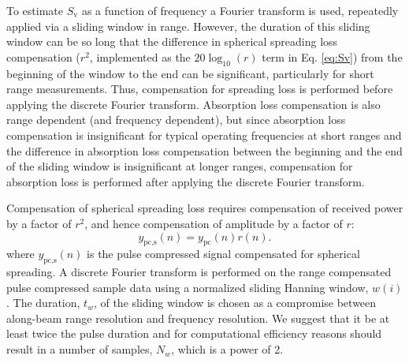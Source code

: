 \documentclass[preprint,12pt,TurnOnLineNumbers]{JASAnew}
\newcommand{\samplesymt}{n}
\newcommand{\genidxsym}{i}
\newcommand{\ypc}{y_{\textrm{pc}}}
\newcommand{\ypcspread}{y_{\textrm{pc,s}}}
\newcommand{\hannw}{w}
\newcommand{\nw}{N_{\hannw}}
\newcommand{\tslide}{t_w}
\newcommand{\sv}{S_{\textrm{v}}}
\newcommand{\range}{r}
\begin{document}
To estimate $\sv$ as a function of frequency a Fourier transform is used, repeatedly applied via a sliding window in range. However, the duration of this sliding window can be so long that the difference in spherical spreading loss compensation ($r^2$, implemented as the $20\log_{10}(\range)$ term in Eq. \ref{eq:Sv}) from the beginning of the window to the end can be significant, particularly for short range measurements. Thus, compensation for spreading loss is performed before applying the discrete Fourier transform. Absorption loss compensation is also range dependent (and frequency dependent), but since absorption loss compensation is insignificant for typical operating frequencies at short ranges and the difference in absorption loss compensation between the beginning and the end of the sliding window is insignificant at longer ranges, compensation for absorption loss is performed after applying the discrete Fourier transform.

Compensation of spherical spreading loss requires compensation of received power by a factor of $r^2$, and hence compensation of amplitude by a factor of $\range$:
%
\begin{equation}
\label{eq:spreadcomp}
\ypcspread(\samplesymt) = \ypc(\samplesymt)\range(\samplesymt).
\end{equation}
%
where $\ypcspread(\samplesymt)$ is the pulse compressed signal compensated for spherical spreading. A discrete Fourier transform is performed on the range compensated pulse compressed sample data using a normalized sliding Hanning window, $\hannw(\genidxsym)$. The duration, $\tslide$, of the sliding window is chosen as a compromise between along-beam range resolution and frequency resolution. We suggest that it be at least twice the pulse duration and for computational efficiency reasons should result in a number of samples, $\nw$, which is a power of 2.
\end{document}
